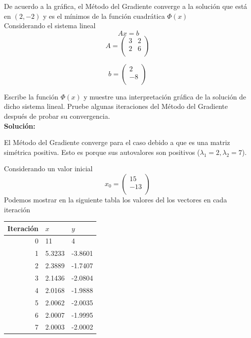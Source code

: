 De acuerdo a la gráfica, el Método del Gradiente converge a la solución que está en $(2,-2)$ y es el mínimos de la función cuadrática $\Phi(x)$\\

Considerando el sistema lineal
$$ Ax=b$$
$$ A=\begin{pmatrix}
     3 &  2 \\
     2 &  6 \\
    \end{pmatrix}\ $$
    
$$ b=\begin{pmatrix}
     2 \\
     -8 \\
    \end{pmatrix}\ $$
    
Escribe la función $ \Phi(x) $ y muestre una interpretación gráfica de la solución de dicho sistema lineal. Pruebe algunas iteraciones del Método del Gradiente después de probar su convergencia.\\

\textbf{Solución:}

El Método del Gradiente converge para el caso debido a que es una matriz simétrica positiva. Esto es porque sus autovalores son positivos ($ \lambda_1=2, \lambda_2=7$).

Considerando un valor inicial 
$$x_0 = \begin{pmatrix}
     15 \\
     -13 \\
    \end{pmatrix}\ $$
Podemos mostrar en la siguiente tabla los valores del los vectores en cada iteración

\begin{table}[h]
    \centering
    \begin{tabular}{|r|l|l|}
        Iteración & $x$ &    $y$   \\
        \hline
         0  &  11  & 4  \\
         1  & 5.3233 & -3.8601 \\
         2  & 2.3889 & -1.7407 \\
         3  & 2.1436 & -2.0804 \\
         4  & 2.0168 & -1.9888 \\
         5  & 2.0062 & -2.0035 \\
         6  & 2.0007 & -1.9995 \\
         7  & 2.0003 & -2.0002\\

    \end{tabular}
\end{table}

